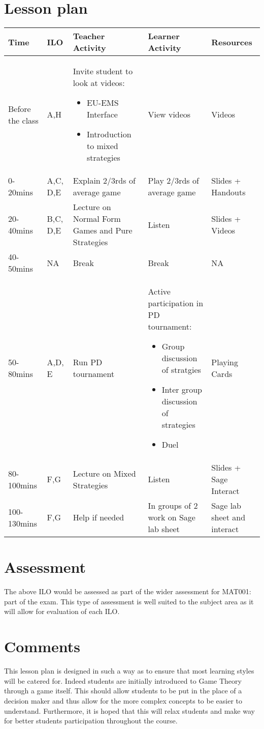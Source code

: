 \documentclass[12pt]{article}
\begin{document}
\section{Lesson plan}
\begin{center}
\begin{tabular}{|p{2cm}|p{.75cm}|p{4.5cm}|p{4.5cm}|p{2cm}|}
\hline
Time&ILO&Teacher Activity& Learner Activity& Resources\\\hline
Before the class&A,H&Invite student to look at videos:\begin{itemize}\item EU-EMS Interface \item Introduction to mixed strategies\end{itemize}&View videos&Videos\\\hline
0-20mins&A,C, D,E&Explain 2/3rds of average game&Play 2/3rds of average game&Slides + Handouts\\\hline
20-40mins&B,C, D,E&Lecture on Normal Form Games and Pure Strategies&Listen&Slides + Videos\\\hline
40-50mins&NA&Break&Break&NA\\\hline
50-80mins&A,D, E&Run PD tournament&Active participation in PD tournament:\begin{itemize}\item Group discussion of stratgies\item Inter group discussion of strategies\item Duel\end{itemize}&Playing Cards\\\hline
80-100mins&F,G&Lecture on Mixed Strategies&Listen&Slides + Sage Interact\\\hline
100-130mins&F,G&Help if needed& In groups of 2 work on Sage lab sheet&Sage lab sheet and interact\\\hline
\end{tabular}
\end{center}

\section{Assessment}
The above ILO would be assessed as part of the wider assessment for MAT001: part of the exam. This type of assessment is well suited to the subject area as it will allow for evaluation of each ILO.


\section{Comments}
This lesson plan is designed in such a way as to ensure that most learning styles will be catered for. Indeed students are initially introduced to Game Theory through a game itself. This should allow students to be put in the place of a decision maker and thus allow for the more complex concepts to be easier to understand. Furthermore, it is hoped that this will relax students and make way for better students participation throughout the course.
\end{document}
